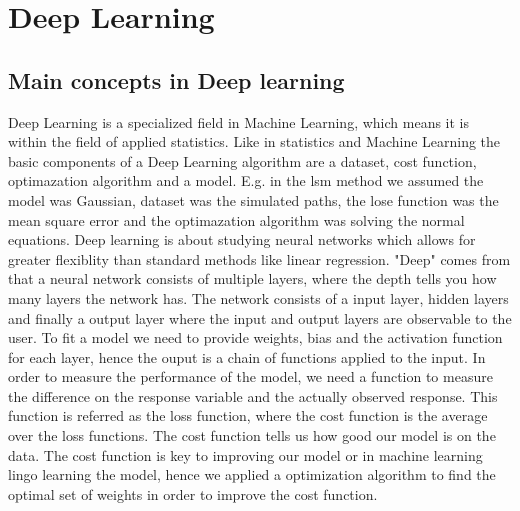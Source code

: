 
\chapter{Deep Learning} %

\label{Chapter4} %


\section{Main concepts in Deep learning}
Deep Learning is a specialized field in Machine Learning, which means it is within the field of applied statistics. Like in statistics and Machine Learning the basic components of a Deep Learning algorithm are a dataset, cost function, optimazation algorithm and a model. E.g. in the lsm method we assumed the model was Gaussian, dataset was the simulated paths, the lose function was the mean square error and the optimazation algorithm was solving the normal equations. Deep learning is about studying neural networks which allows for greater flexiblity than standard methods like linear regression. "Deep" comes from that a neural network consists of multiple layers, where the depth tells you how many layers the network has. The network consists of a input layer, hidden layers and finally a output layer where the input and output layers are observable to the user. To fit a model we need to provide weights, bias and the activation function for each layer, hence the ouput is a chain of functions applied to the input. In order to measure the performance of the model, we need a function to measure the difference on the response variable and the actually observed response. This function is referred as the loss function, where the cost function is the average over the loss functions. The cost function tells us how good our model is on the data. The cost function is key to improving our model or in machine learning lingo learning the model, hence we applied a optimization algorithm to find the optimal set of weights in order to improve the cost function.  \parencite{Goodfellow-et-al-2016}


